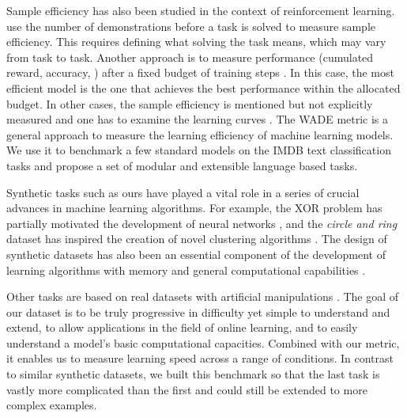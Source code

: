 Sample efficiency has also been studied in the context of
reinforcement learning. \cite{chevalier-boisvertBabyaiPlatformStudy2018} use the
number of demonstrations before a task is solved to measure sample efficiency.
This requires defining what solving the task means, which may vary from task to
task. Another approach is to measure performance (cumulated reward, accuracy,
\etc) after a fixed budget of training steps
\cite{yaratsImprovingSampleEfficiency2019}. In this case, the most efficient
model is the one that achieves the best performance within the allocated budget.
In other cases, the sample efficiency is mentioned but not explicitly measured
and one has to examine the learning curves
\cite{buckmanSampleefficientReinforcementLearning2018}. The \ac{WADE} metric is
a general approach to measure the learning efficiency of machine learning
models. We use it to benchmark a few standard models on the IMDB text
classification tasks \cite{maasLearningWordVectors2011} and propose a set of
modular and extensible language based tasks.

Synthetic tasks such as ours have played a vital role in a series of crucial
advances in machine learning algorithms. For example, the XOR problem has
partially motivated the development of neural networks
\cite{minskyPerceptronsIntroductionComputational1972,
  rumelhartLearningInternalRepresentations1985}, and the \emph{circle and ring}
dataset has inspired the creation of novel clustering algorithms
\cite{ngSpectralClusteringAnalysis2001}. The design of synthetic datasets has also been
an essential component of the development of learning algorithms with
memory and general computational capabilities
\cite{hochreiterLongShortTermMemory1997,
  joulinInferringAlgorithmicPatterns2015, gravesNeuralTuringMachines2014,
  westonAICompleteQuestionAnswering2016, richardsonProbingNaturalLanguage2020}.

Other tasks are based on real datasets with artificial manipulations
\cite{krizhevskyLearningMultipleLayers2009, srivastavaCompeteCompute2013a,
  goodfellowEmpiricalInvestigationCatastrophic2014,
  nguyenVariationalContinualLearning2017}. The goal of our dataset is to be
truly progressive in difficulty yet simple to understand and extend, to allow
applications in the field of online learning, and to easily understand a model's
basic computational capacities. Combined with our metric, it enables us to
measure learning speed across a range of conditions. In contrast to similar
synthetic datasets, we built this benchmark so that the last task is vastly more
complicated than the first and could still be extended to more complex examples.




